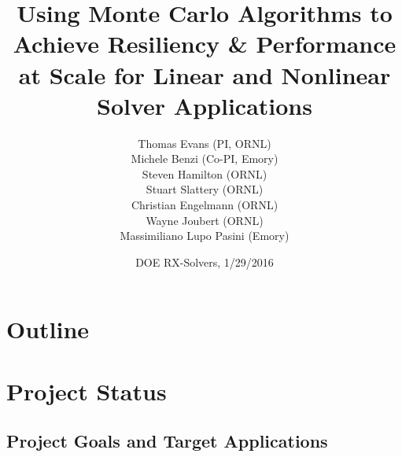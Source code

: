 \documentclass{beamer}
\title[MCREX]{Using Monte Carlo Algorithms to Achieve Resiliency \& Performance
  at Scale for Linear and Nonlinear Solver Applications}
\author{Thomas Evans (PI, ORNL)\\
  Michele Benzi (Co-PI, Emory)\\
  Steven Hamilton (ORNL)\\
  Stuart Slattery (ORNL)\\
  Christian Engelmann (ORNL)\\
  Wayne Joubert (ORNL)\\
  Massimiliano Lupo Pasini (Emory)
}
\date[DOE, 2016]{DOE RX-Solvers, 1/29/2016}
\begin{document}

{
  \begin{frame}
    \titlepage
  \end{frame}
}

\section*{Outline}

\begin{frame}
  \tableofcontents
\end{frame}

\section{Project Status}
\subsection{Project Goals and Target Applications}
\end{document}
